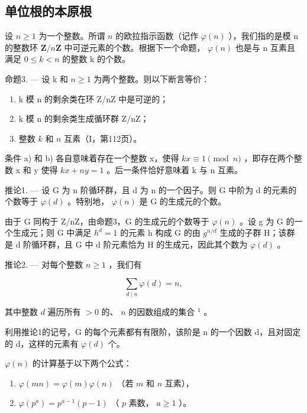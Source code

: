 \subsection{单位根的本原根}

设 \(n \geqslant 1\) 为一个整数。所谓 \(n\) 的欧拉指示函数（记作 \(\varphi(n)\) ），我们指的是模 n 的整数环 \(\mathbf{Z}/n\mathbf{Z}\) 中可逆元素的个数。根据下一个命题， \(\varphi(n)\) 也是与 n 互素且满足 \(0 \leqslant k < n\) 的整数 k 的个数。

命题3. --- 设 k 和 \(n \geqslant 1\) 为两个整数。则以下断言等价：

\begin{enumerate}
\def\labelenumi{\alph{enumi})}
\item
  k 模 n 的剩余类在环 Z/nZ 中是可逆的；
\item
  k 模 n 的剩余类生成循环群 Z/nZ；
\item
  整数 \(k\) 和 \(n\) 互素（I，第112页）。
\end{enumerate}

条件 a) 和 b) 各自意味着存在一个整数 x，使得 \(kx \equiv 1 \pmod{n}\) ，即存在两个整数 x 和 y 使得 \(kx + ny = 1\) 。后一条件恰好意味着 k 与 n 互素。

推论1. --- 设 G 为 n 阶循环群，且 d 为 n 的一个因子。则 G 中阶为 d 的元素的个数等于 \(\varphi(d)\) 。特别地， \(\varphi(n)\) 是 G 的生成元的个数。

由于 G 同构于 Z/nZ，由命题3，G 的生成元的个数等于 \(\varphi(n)\) 。设 g 为 G 的一个生成元；则 G 中满足 \(h^{d}=1\) 的元素 h 构成 G 的由 \(g^{n/d}\) 生成的子群 H；该群是 d 阶循环群，且 G 中 d 阶元素恰为 H 的生成元，因此其个数为 \(\varphi(d)\) 。

推论2. --- 对每个整数 \(n \geqslant 1\) ，我们有

\[
\sum_ {d \mid n} \varphi (d) = n,\tag{1}
\]

其中整数 \(d\) 遍历所有 \(>0\) 的、 \(n\) 的因数组成的集合 \(^{1}\) 。

利用推论1的记号，G 的每个元素都有有限阶，该阶是 n 的一个因数 d，且对固定的 d，这样的元素有 \(\varphi(d)\) 个。

\(\varphi(n)\) 的计算基于以下两个公式：

\begin{enumerate}
\def\labelenumi{(\arabic{enumi})}
\setcounter{enumi}{1}
\item
  \(\varphi(mn) = \varphi(m)\varphi(n)\) （若 \(m\) 和 \(n\) 互素），
\item
  \(\varphi(p^a) = p^{a-1}(p - 1)\) （ \(p\) 素数， \(a \geqslant 1\) ）。
\end{enumerate}


